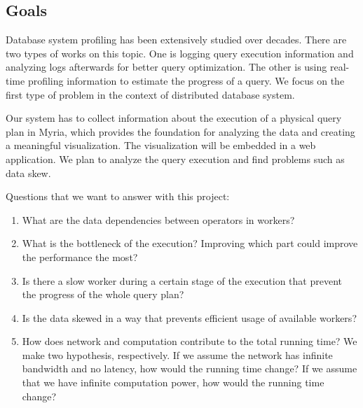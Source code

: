 \documentclass[11pt]{scrartcl}
\begin{document}
\subsection{Goals}
\label{sec:objective}

Database system profiling has been extensively studied over decades. There are two types of works on this topic. One is logging query execution information and analyzing logs afterwards for better query optimization. The other is using real-time profiling information to estimate the progress of a query. We focus on the first type of problem in the context of distributed database system.

Our system has to collect information about the execution of a physical query plan in Myria, which provides the foundation for analyzing the data and creating a meaningful visualization. The visualization will be embedded in a web application. We plan to analyze the query execution and find problems such as data skew.

\vspace{5px}

\noindent Questions that we want to answer with this project:

\begin{enumerate}
  \item What are the data dependencies between operators in workers?
  \item What is the bottleneck of the execution? Improving which part could improve the performance the most?
  \item Is there a slow worker during a certain stage of the execution that prevent the progress of the whole query plan?
  \item Is the data skewed in a way that prevents efficient usage of available workers?
  \item How does network and computation contribute to the total running time? We make two hypothesis, respectively. If we assume the network has infinite bandwidth and no latency, how would the running time change? If we assume that we have infinite computation power, how would the running time change?

\end{enumerate}
\end{document}

